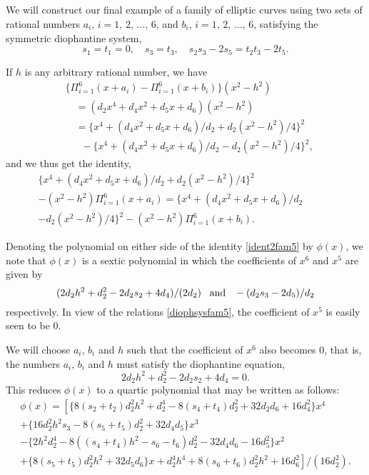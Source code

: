 \documentclass[11pt, leqno]{article}
\begin{document}
\subsection{}
We will construct our final example of a family of elliptic curves using  two sets of rational numbers $a_i,\,i=1,\,2,\,\ldots,\,6$, and $b_i,\,i=1,\,2,\,\ldots,\,6$, satisfying the symmetric diophantine system,
\begin{equation}
s_1=t_1=0,\quad s_3=t_3, \quad s_2s_3-2s_5=t_2t_3-2t_5. \label{diophsysfam5}
\end{equation}

If $h$ is any arbitrary rational number, we have 
\begin{equation}
\begin{aligned}
&\{\Pi_{i=1}^6(x+a_i)-\Pi_{i=1}^6(x+b_i)\}(x^2-h^2)\\
& \quad =(d_2x^4+d_4x^2+d_5x+d_6)(x^2-h^2)\\
& \quad =\{x^4+(d_4x^2+d_5x+d_6)/d_2+d_2(x^2-h^2)/4\}^2\\
&\quad \;\;-\{x^4+(d_4x^2+d_5x+d_6)/d_2-d_2(x^2-h^2)/4\}^2, \label{ident1fam5}
\end{aligned}
\end{equation}
and we thus get the identity,
\begin{multline}
\{x^4+(d_4x^2+d_5x+d_6)/d_2+d_2(x^2-h^2)/4\}^2\\
-(x^2-h^2)\Pi_{i=1}^6(x+a_i)=\{x^4+(d_4x^2+d_5x+d_6)/d_2 \quad \quad \quad \\
-d_2(x^2-h^2)/4\}^2-(x^2-h^2)\Pi_{i=1}^6(x+b_i). \label{ident2fam5}
\end{multline}

Denoting the polynomial on either side of the identity \eqref{ident2fam5} by $\phi(x)$, we note that $\phi(x)$ is a sextic polynomial in which   the coefficients of $x^6$ and $x^5$ are given  by
\begin{equation}
(2d_2h^2+d_2^2-2d_2s_2+4d_4)/(2d_2)\;\;\; {\rm and}\;\;\;   -(d_2s_3-2d_5)/d_2
\end{equation}
respectively. In view of the relations \eqref{diophsysfam5}, the coefficient of $x^5$ is  easily seen to be 0. 

We will choose $a_i,\,b_i$ and $h$ such that the coefficient of $x^6$ also becomes 0, that is, the numbers $a_i,\,b_i$ and $h$ must satisfy the diophantine equation,
\begin{equation}
2d_2h^2+d_2^2-2d_2s_2+4d_4=0. \label{cfx6fam5} 
\end{equation}
 This  reduces $\phi(x)$ to a quartic polynomial that may be written as follows:
\begin{multline}
\phi(x)=\left[\{8(s_2+t_2)d_2^2h^2+d_2^4-8(s_4+t_4)d_2^2+32d_2d_6+16d_4^2\}x^4 \right.\\
+\{16d_2^2h^2s_3-8(s_5+t_5)d_2^2+32d_4d_5\}x^3\\
-\{2h^2d_2^4-8((s_4+t_4)h^2-s_6-t_6)d_2^2-32d_4d_6-16d_5^2\}x^2\\
+\left. \{8(s_5+t_5)d_2^2h^2+32d_5d_6\}x+d_2^4h^4+8(s_6+t_6)d_2^2h^2+16d_6^2\right]/(16d_2^2).
\end{multline}
\end{document}
